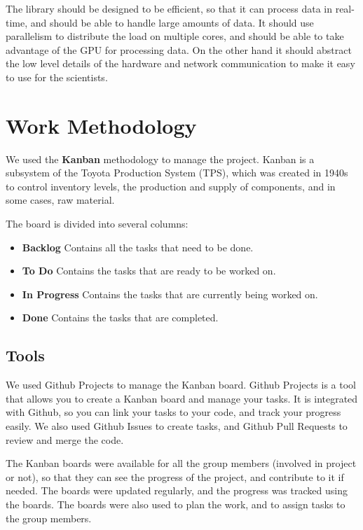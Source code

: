 \begin{spacing}{1.2}
    The library should be designed to be efficient, so that it can process data in real-time, and should be able to handle
    large amounts of data. It should use parallelism to distribute the load on multiple cores, and should be able to
    take advantage of the GPU for processing data. On the other hand it should abstract the low level details of the
    hardware and network communication to make it easy to use for the scientists.




    \section{Work Methodology}
    We used the \textbf{Kanban} methodology to manage the project. Kanban is a subsystem of the Toyota Production System (TPS),
    which was created in 1940s to control inventory levels, the production and
    supply of components, and in some cases, raw material. \cite{junior2010variations}

    The board is divided into several columns:
    \begin{itemize}
        \item \textbf{Backlog} Contains all the tasks that need to be done.
        \item \textbf{To Do} Contains the tasks that are ready to be worked on.
        \item \textbf{In Progress} Contains the tasks that are currently being worked on.
        \item \textbf{Done} Contains the tasks that are completed.
    \end{itemize}

    \subsection{Tools}
    We used Github Projects to manage the Kanban board. Github Projects is a tool that allows you to create a Kanban board
    and manage your tasks. It is integrated with Github, so you can link your tasks to your code, and track your progress
    easily. We also used Github Issues to create tasks, and Github Pull Requests to review and merge the code.

    The Kanban boards were available for all the group members (involved in project or not), so that they can see the progress
    of the project, and contribute to it if needed. The boards were updated regularly, and the progress was tracked using the
    boards. The boards were also used to plan the work, and to assign tasks to the group members.


\end{spacing}
